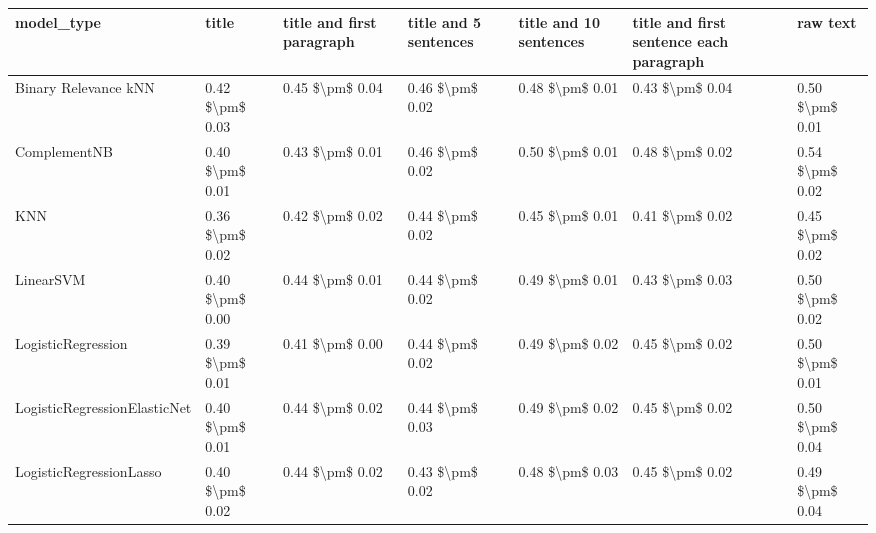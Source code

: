 \begin{tabular}{lllllll}
\toprule
                     model\_type &           title & title and first paragraph & title and 5 sentences & title and 10 sentences & title and first sentence each paragraph &            raw text \\
\midrule
           Binary Relevance kNN & 0.42 \$\textbackslash pm\$ 0.03 &           0.45 \$\textbackslash pm\$ 0.04 &       0.46 \$\textbackslash pm\$ 0.02 &        0.48 \$\textbackslash pm\$ 0.01 &                         0.43 \$\textbackslash pm\$ 0.04 &     0.50 \$\textbackslash pm\$ 0.01 \\
                   ComplementNB & 0.40 \$\textbackslash pm\$ 0.01 &           0.43 \$\textbackslash pm\$ 0.01 &       0.46 \$\textbackslash pm\$ 0.02 &        0.50 \$\textbackslash pm\$ 0.01 &                         0.48 \$\textbackslash pm\$ 0.02 &     0.54 \$\textbackslash pm\$ 0.02 \\
                            KNN & 0.36 \$\textbackslash pm\$ 0.02 &           0.42 \$\textbackslash pm\$ 0.02 &       0.44 \$\textbackslash pm\$ 0.02 &        0.45 \$\textbackslash pm\$ 0.01 &                         0.41 \$\textbackslash pm\$ 0.02 &     0.45 \$\textbackslash pm\$ 0.02 \\
                      LinearSVM & 0.40 \$\textbackslash pm\$ 0.00 &           0.44 \$\textbackslash pm\$ 0.01 &       0.44 \$\textbackslash pm\$ 0.02 &        0.49 \$\textbackslash pm\$ 0.01 &                         0.43 \$\textbackslash pm\$ 0.03 &     0.50 \$\textbackslash pm\$ 0.02 \\
             LogisticRegression & 0.39 \$\textbackslash pm\$ 0.01 &           0.41 \$\textbackslash pm\$ 0.00 &       0.44 \$\textbackslash pm\$ 0.02 &        0.49 \$\textbackslash pm\$ 0.02 &                         0.45 \$\textbackslash pm\$ 0.02 &     0.50 \$\textbackslash pm\$ 0.01 \\
   LogisticRegressionElasticNet & 0.40 \$\textbackslash pm\$ 0.01 &           0.44 \$\textbackslash pm\$ 0.02 &       0.44 \$\textbackslash pm\$ 0.03 &        0.49 \$\textbackslash pm\$ 0.02 &                         0.45 \$\textbackslash pm\$ 0.02 &     0.50 \$\textbackslash pm\$ 0.04 \\
        LogisticRegressionLasso & 0.40 \$\textbackslash pm\$ 0.02 &           0.44 \$\textbackslash pm\$ 0.02 &       0.43 \$\textbackslash pm\$ 0.02 &        0.48 \$\textbackslash pm\$ 0.03 &                         0.45 \$\textbackslash pm\$ 0.02 &     0.49 \$\textbackslash pm\$ 0.04 \\

\end{tabular}
